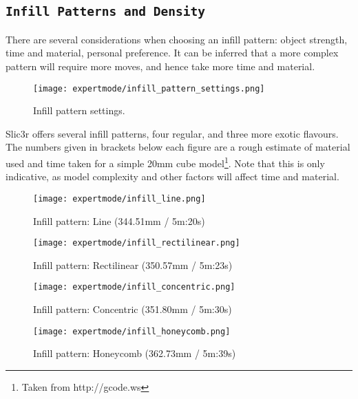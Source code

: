 
\subsection{\texttt{Infill Patterns and Density}} %
\label{sec:infill_patterns_and_density}

There are several considerations when choosing an infill pattern: object strength, time and material, personal preference.  It can be inferred that a more complex pattern will require more moves, and hence take more time and material.

\begin{figure}[H]
\centering
\texttt{[image: expertmode/infill\_pattern\_settings.png]}
\caption{Infill pattern settings.}
\label{fig:infill_pattern_settings}
\end{figure}

Slic3r offers several infill patterns, four regular, and three more exotic flavours.  The numbers given in brackets below each figure are a rough estimate of material used and time taken for a simple 20mm cube model\footnote{Taken from http://gcode.ws}.  Note that this is only indicative, as model complexity and other factors will affect time and material.

\begin{figure}[H]
\centering
\texttt{[image: expertmode/infill\_line.png]}
\caption{Infill pattern: Line (344.51mm / 5m:20s)}
\label{fig:infill_line}
\end{figure}

\begin{figure}[H]
\centering
\texttt{[image: expertmode/infill\_rectilinear.png]}
\caption{Infill pattern: Rectilinear (350.57mm / 5m:23s)}
\label{fig:infill_rectilinear}
\end{figure}

\begin{figure}[H]
\centering
\texttt{[image: expertmode/infill\_concentric.png]}
\caption{Infill pattern: Concentric (351.80mm / 5m:30s)}
\label{fig:infill_concentric}
\end{figure}

\begin{figure}[H]
\centering
\texttt{[image: expertmode/infill\_honeycomb.png]}
\caption{Infill pattern: Honeycomb (362.73mm / 5m:39s)}
\label{fig:infill_honeycomb}
\end{figure}


